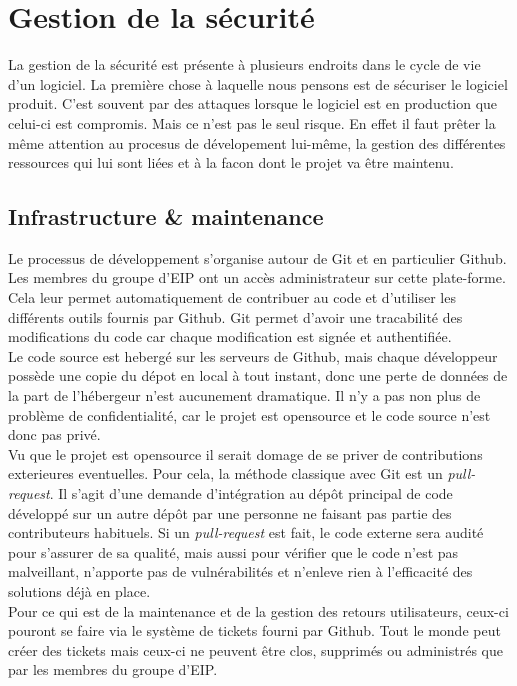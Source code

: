 \section{Gestion de la sécurité}

La gestion de la sécurité est présente à plusieurs endroits dans le cycle de vie d'un logiciel. La première chose à laquelle nous pensons est de sécuriser le logiciel produit. C'est souvent par des attaques lorsque le logiciel est en production que celui-ci est compromis. Mais ce n'est pas le seul risque. En effet il faut prêter la même attention au procesus de dévelopement lui-même, la gestion des différentes ressources qui lui sont liées et à la facon dont le projet va être maintenu.

\subsection{Infrastructure \& maintenance}

Le processus de développement s'organise autour de Git et en particulier Github. Les membres du groupe d'EIP ont un accès administrateur sur cette plate-forme. Cela leur permet automatiquement de contribuer au code et d'utiliser les différents outils fournis par Github. Git permet d'avoir une tracabilité des modifications du code car chaque modification est signée et authentifiée.\\

Le code source est hebergé sur les serveurs de Github, mais chaque développeur possède une copie du dépot en local à tout instant, donc une perte de données de la part de l'hébergeur n'est aucunement dramatique. Il n'y a pas non plus de problème de confidentialité, car le projet est opensource et le code source n'est donc pas privé.\\

Vu que le projet est opensource il serait domage de se priver de contributions exterieures eventuelles. Pour cela, la méthode classique avec Git est un \textit{pull-request}. Il s'agit d'une demande d'intégration au dépôt principal de code développé sur un autre dépôt par une personne ne faisant pas partie des contributeurs habituels. Si un \textit{pull-request} est fait, le code externe sera audité pour s'assurer de sa qualité, mais aussi pour vérifier que le code n'est pas malveillant, n'apporte pas de vulnérabilités et n'enleve rien à l'efficacité des solutions déjà en place.\\

Pour ce qui est de la maintenance et de la gestion des retours utilisateurs, ceux-ci pouront se faire via le système de tickets fourni par Github. Tout le monde peut créer des tickets mais ceux-ci ne peuvent être clos, supprimés ou administrés que par les membres du groupe d'EIP.


